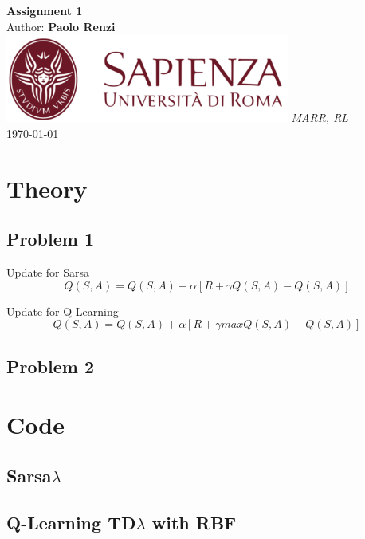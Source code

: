\documentclass[10pt,a4paper]{article}
\begin{document}
\begin{titlepage}
    \begin{center}
        \vspace*{1cm}
        \Huge\textbf{Assignment 1}\\
        \vspace{1.5cm}
        \Large Author:
        \textbf{Paolo Renzi}\\
        \vspace{0.5cm}
        \vfill
        \includegraphics[width=0.7\textwidth]{images/sapienza_logo.png}
        \vfill
        \vspace{0.8cm}
        \Large \textit{MARR, RL}\\
        \today
    \end{center}
\end{titlepage}
\newpage

\section*{Theory}
\subsection*{Problem 1}
Update for Sarsa 
\begin{equation}
    Q(S, A) = Q(S, A) + \alpha [R +\gamma Q(S, A)- Q(S, A)]
\end{equation}


Update for Q-Learning
\begin{equation}
    Q(S, A) = Q(S, A) + \alpha [R +\gamma max Q(S, A)- Q(S, A)]
\end{equation}


\newpage
\subsection*{Problem 2}


\newpage
\section*{Code}

\subsection*{Sarsa\(\lambda\) }

\subsection*{Q-Learning TD\(\lambda\) with RBF}
\end{document}
